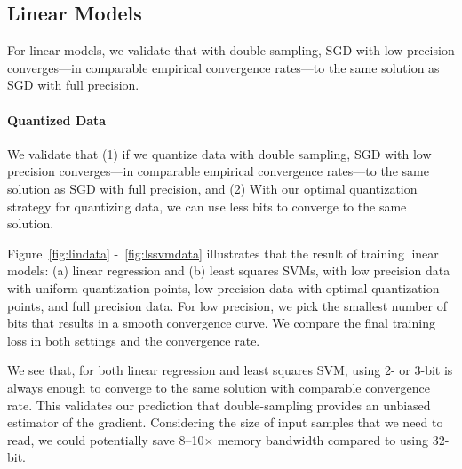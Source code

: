 \documentclass{article}
\begin{document}
\subsection{Linear Models}

For linear models, we validate that with double sampling, SGD with low
precision converges---in comparable empirical 
convergence rates---to the same solution
as SGD with full precision.

\paragraph{Quantized Data}
We validate that (1) if we quantize data with double sampling, SGD with low precision converges---in comparable empirical 
convergence rates---to the same solution as SGD with full precision, and (2) With our optimal quantization strategy for quantizing data, we can use less bits to converge to the same solution.

Figure~\ref{fig:lindata} -~\ref{fig:lssvmdata} illustrates that the result of training linear models:
(a) linear regression and (b) least squares SVMs,
with low precision data with uniform quantization points, low-precision data with optimal quantization points, and 
full precision data. For low precision, we pick the 
smallest number of bits that results in a smooth convergence
curve. We compare the final training loss in both settings and the convergence rate.


We see that, for both linear regression 
and least squares SVM,
using 2- or 3-bit is always enough
to converge to the same solution
with comparable convergence rate. 
This validates our prediction that
double-sampling provides an
unbiased estimator of the gradient.
Considering the size of input
samples that we need to read, we
could potentially save 8--10$\times$ 
memory bandwidth compared to using 
32-bit. 
\end{document}
